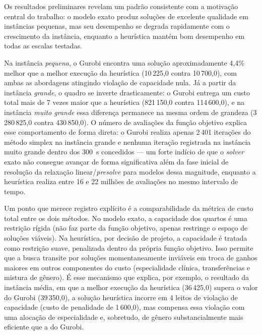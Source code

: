\documentclass[12pt,a4paper]{article}
\begin{document}
Os resultados preliminares revelam um padrão consistente com a motivação central do
trabalho: o modelo exato produz soluções de excelente qualidade em
instâncias pequenas, mas seu desempenho se degrada rapidamente com o crescimento da
instância, enquanto a heurística mantém bom desempenho em todas as
escalas testadas.

Na instância \textit{pequena}, o Gurobi encontra uma solução aproximadamente 4,4\%
melhor que a melhor execução da heurística (10\,225,0 contra 10\,700,0), com ambas
as abordagens atingindo violação de capacidade nula. Já a partir da instância \textit{grande}, o quadro se inverte
drasticamente: o Gurobi entrega um custo total mais de 7 vezes maior que a
heurística (821\,150,0 contra 114\,600,0), e na instância \textit{muito grande} essa
diferença permanece na mesma ordem de grandeza (3\,280\,825,0 contra 430\,850,0). O
número de avaliações da função objetivo explica esse comportamento de forma direta:
o Gurobi realiza apenas 2\,401 iterações do método simplex na instância grande e
nenhuma iteração registrada na instância muito grande dentro dos 300~s
concedidos — um forte indício de que o \textit{solver} exato não consegue avançar de
forma significativa além da fase inicial de resolução da relaxação linear/\textit{presolve}
para modelos dessa magnitude, enquanto a heurística realiza entre 16 e 22 milhões de
avaliações no mesmo intervalo de tempo.

Um ponto que merece registro explícito é a comparabilidade da métrica de custo total
entre os dois métodos. No modelo exato, a capacidade dos quartos é uma
restrição rígida (não faz parte da função objetivo, apenas restringe o
espaço de soluções viáveis). Na heurística, por decisão de projeto, a capacidade é
tratada como restrição suave, penalizada dentro da própria função objetivo. Isso permite que a busca transite por soluções momentaneamente inviáveis em troca de
ganhos maiores em outros componentes do custo (especialidade clínica, transferências
e mistura de gênero). É esse mecanismo que explica, por exemplo, o resultado da
instância média, em que a melhor execução da heurística (36\,425,0) supera o valor
do Gurobi (39\,350,0), a solução
heurística incorre em 4 leitos de violação de capacidade (custo de penalidade de
1\,600,0), mas compensa essa violação com uma alocação de especialidade e,
sobretudo, de gênero substancialmente mais eficiente que a do Gurobi.
\end{document}
